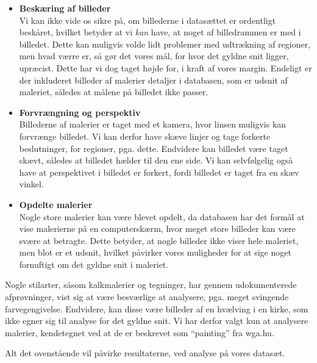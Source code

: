 {\begin{itemize}
    \item \textbf{Beskæring af billeder}\\
        Vi kan ikke vide os sikre på, om billederne i datasættet er
        ordentligt beskåret, hvilket betyder at vi \emph{kan} have, at
        noget af billedrammen er med i billedet. Dette kan muligvis
        volde lidt problemer med udtrækning af regioner, men hvad værre
        er, så gør det vores mål, for hvor det gyldne snit ligger,
        upræcist. Dette har vi dog taget højde for, i kraft af vores
        margin.  Endeligt er der inkluderet billeder af malerier
        detaljer i databasen, som er udsnit af maleriet, således at
        målene på billedet ikke passer.
    \item \textbf{Forvrængning og perspektiv}\\
        Billederne af malerier er taget med et kamera, hvor linsen muligvis kan
        forvrænge billedet. Vi kan derfor have skæve linjer og tage
        forkerte beslutninger, for regioner, pga. dette. Endvidere kan
        billedet være taget skævt, således at billedet hælder til den
        ene side. Vi kan selvfølgelig også have at perspektivet i
        billedet er forkert, fordi billedet er taget fra en skæv vinkel.
    \item \textbf{Opdelte malerier}\\
        Nogle store malerier kan være blevet opdelt, da databasen har
        det formål at vise malerierne på en computerskærm, hvor meget
        store billeder kan være svære at betragte. Dette betyder, at
        nogle billeder ikke viser hele maleriet, men blot er et udsnit,
        hvilket påvirker vores muligheder for at sige noget fornuftigt
        om det gyldne snit i maleriet.
\end{itemize}

Nogle stilarter, såsom kalkmalerier og tegninger, har gennem
udokumenterede afprøvninger, vist sig at være besværlige at analysere,
pga. meget svingende farvegengivelse. Endvidere, kan disse være billeder
af en hvælving i en kirke, som ikke egner sig til analyse for det gyldne
snit. Vi har derfor valgt kun at analysere malerier, kendetegnet ved at
de er beskrevet som ``painting'' fra wga.hu.

Alt det ovenstående vil påvirke resultaterne, ved analyse på vores
datasæt.

}
